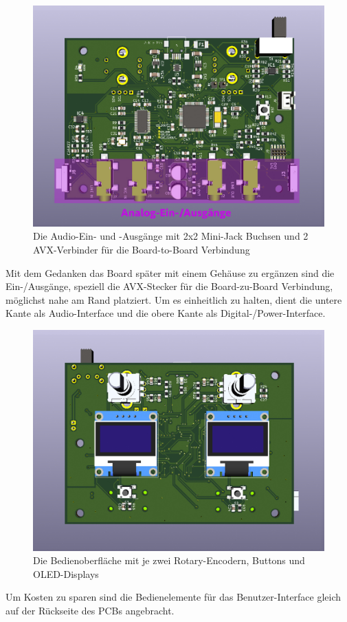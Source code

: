 \begin{figure} [H]
\begin{center}
 \includegraphics[scale=0.37]{../graphics/PCB-Layout_INOUT.jpg}
 \caption{Die Audio-Ein- und -Ausgänge mit 2x2 Mini-Jack Buchsen und 2 AVX-Verbinder für die Board-to-Board Verbindung}
\label{fig:PCB_INOUT}
\end{center}
\end{figure}

Mit dem Gedanken das Board später mit einem Gehäuse zu ergänzen sind die Ein-/Ausgänge, speziell die AVX-Stecker für die Board-zu-Board Verbindung, möglichst nahe am Rand platziert. Um es einheitlich zu halten, dient die untere Kante als Audio-Interface und die obere Kante als Digital-/Power-Interface. 

\begin{figure} [H]
\begin{center}
 \includegraphics[scale=0.37]{../graphics/PCB-Layout_GUI.jpg}
 \caption{Die Bedienoberfläche mit je zwei Rotary-Encodern, Buttons und OLED-Displays}
\label{fig:PCB_GUI}
\end{center}
\end{figure}

Um Kosten zu sparen sind die Bedienelemente für das Benutzer-Interface gleich auf der Rückseite des PCBs angebracht.